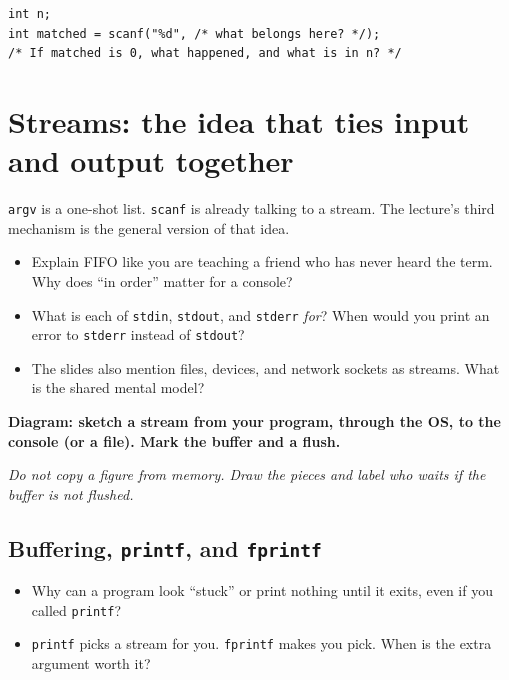 \documentclass[12pt]{article}
\begin{document}
\begin{lstlisting}
int n;
int matched = scanf("%d", /* what belongs here? */);
/* If matched is 0, what happened, and what is in n? */
\end{lstlisting}

\vspace{1.8em}

\section{Streams: the idea that ties input and output together}

\texttt{argv} is a one-shot list. \texttt{scanf} is already talking to a stream. The lecture's third mechanism is the general version of that idea.

\begin{itemize}
  \item Explain FIFO like you are teaching a friend who has never heard the term. Why does ``in order'' matter for a console?
  \vspace{2.2em}
  \item What is each of \texttt{stdin}, \texttt{stdout}, and \texttt{stderr} \emph{for}? When would you print an error to \texttt{stderr} instead of \texttt{stdout}?
  \vspace{2.4em}
  \item The slides also mention files, devices, and network sockets as streams. What is the shared mental model?
  \vspace{2.0em}
\end{itemize}

\noindent\textbf{Diagram: sketch a stream from your program, through the OS, to the console (or a file). Mark the buffer and a flush.}
\begin{framed}
\begin{minipage}[t][0.35\textheight]{\textwidth}
\vspace{0.6em}
\textit{Do not copy a figure from memory. Draw the pieces and label who waits if the buffer is not flushed.}
\end{minipage}
\end{framed}

\vspace{1.2em}

\subsection{Buffering, \texttt{printf}, and \texttt{fprintf}}
\begin{itemize}
  \item Why can a program look ``stuck'' or print nothing until it exits, even if you called \texttt{printf}?
  \vspace{2.2em}
  \item \texttt{printf} picks a stream for you. \texttt{fprintf} makes you pick. When is the extra argument worth it?
  \vspace{2.2em}
\end{itemize}
\end{document}
